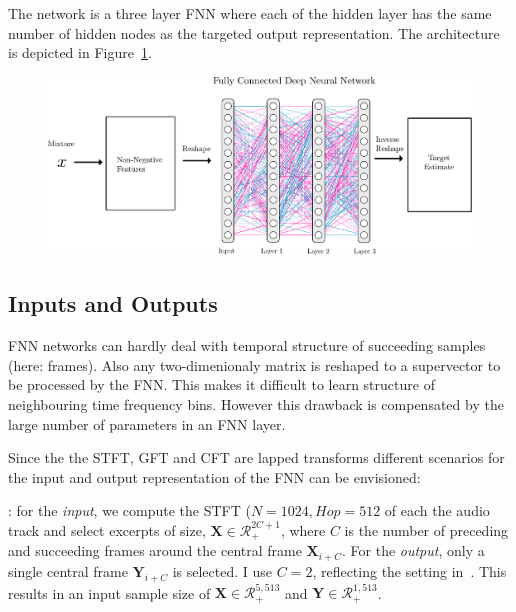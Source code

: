{{\par
The network is a three layer FNN where each of the hidden layer has the same number of hidden nodes as the targeted output representation.
The architecture is depicted in Figure~\ref{fig:cft_dnn}.

\begin{figure}[ht!]
\centering
		\includegraphics[width=\textwidth]{Chapters/06_Separation_Unknown/figures/uhlich_dnn.pdf}
\caption{}
\label{fig:cft_dnn}
\end{figure}

\subsection{Inputs and Outputs}

FNN networks can hardly deal with temporal structure of succeeding samples (here: frames).
Also any two-dimenionaly matrix is reshaped to a supervector to be processed by the FNN.
This makes it difficult to learn structure of neighbouring time frequency bins. However this drawback is compensated by the large number of parameters in an FNN layer.

Since the the STFT, GFT and CFT are lapped transforms different scenarios for the input and output representation of the FNN can be envisioned:

\begin{description}[style=unboxed,leftmargin=0cm]
\item[STFT-STFT]: for the \emph{input}, we compute the STFT (\(N=1024, Hop=512\) of each the audio track and select excerpts of size, \(\mathbf{X} \in \mathcal{R}^{2C + 1}_{+} \), where \(C\) is the number of preceding and succeeding frames around the central frame \(\mathbf{X}_{i+C}\). For the \emph{output}, only a single central frame \(\mathbf{Y}_{i+C}\) is selected.
I use \(C=2\), reflecting the setting in~\cite{uhlich15}. This results in an input sample size of \(\mathbf{X} \in \mathcal{R}_{+}^{5, 513}\) and  \(\mathbf{Y} \in \mathcal{R}_{+}^{1, 513}\).


\end{description}}}
